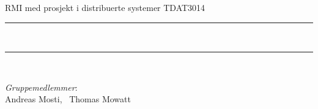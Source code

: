 \newcommand{\HRule}{\rule{\linewidth}{0.5mm}}
\begin{titlepage}
	\vspace*{3cm}
	\begin{center}
		{\Large RMI med prosjekt i distribuerte systemer TDAT3014}
		\HRule \\[0.5cm]
		{\LARGE\textsc{\textbf{\PageTitle}}}
		\HRule \\[1.0cm]
		{\large \DateDeadline} 
		\vspace{\fill}
		\begin{flushleft}
		\emph{Gruppemedlemmer}:\\
			{Andreas Mosti, \ Thomas Mowatt} 
		\end{flushleft}
	\end{center}
\end{titlepage}